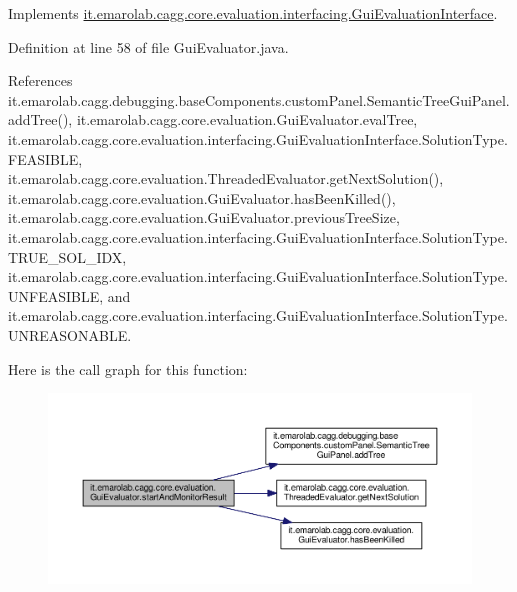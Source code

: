 Implements \hyperlink{interfaceit_1_1emarolab_1_1cagg_1_1core_1_1evaluation_1_1interfacing_1_1GuiEvaluationInterface_adfc8f64a0eacda3e0dd7e9ce8a59d37e}{it.\-emarolab.\-cagg.\-core.\-evaluation.\-interfacing.\-Gui\-Evaluation\-Interface}.



Definition at line 58 of file Gui\-Evaluator.\-java.



References it.\-emarolab.\-cagg.\-debugging.\-base\-Components.\-custom\-Panel.\-Semantic\-Tree\-Gui\-Panel.\-add\-Tree(), it.\-emarolab.\-cagg.\-core.\-evaluation.\-Gui\-Evaluator.\-eval\-Tree, it.\-emarolab.\-cagg.\-core.\-evaluation.\-interfacing.\-Gui\-Evaluation\-Interface.\-Solution\-Type.\-F\-E\-A\-S\-I\-B\-L\-E, it.\-emarolab.\-cagg.\-core.\-evaluation.\-Threaded\-Evaluator.\-get\-Next\-Solution(), it.\-emarolab.\-cagg.\-core.\-evaluation.\-Gui\-Evaluator.\-has\-Been\-Killed(), it.\-emarolab.\-cagg.\-core.\-evaluation.\-Gui\-Evaluator.\-previous\-Tree\-Size, it.\-emarolab.\-cagg.\-core.\-evaluation.\-interfacing.\-Gui\-Evaluation\-Interface.\-Solution\-Type.\-T\-R\-U\-E\-\_\-\-S\-O\-L\-\_\-\-I\-D\-X, it.\-emarolab.\-cagg.\-core.\-evaluation.\-interfacing.\-Gui\-Evaluation\-Interface.\-Solution\-Type.\-U\-N\-F\-E\-A\-S\-I\-B\-L\-E, and it.\-emarolab.\-cagg.\-core.\-evaluation.\-interfacing.\-Gui\-Evaluation\-Interface.\-Solution\-Type.\-U\-N\-R\-E\-A\-S\-O\-N\-A\-B\-L\-E.



Here is the call graph for this function\-:\nopagebreak
\begin{figure}[H]
\begin{center}
\leavevmode
\includegraphics[width=350pt]{classit_1_1emarolab_1_1cagg_1_1core_1_1evaluation_1_1GuiEvaluator_a162aa9204db7d2f115db59a607190990_cgraph}
\end{center}
\end{figure}


